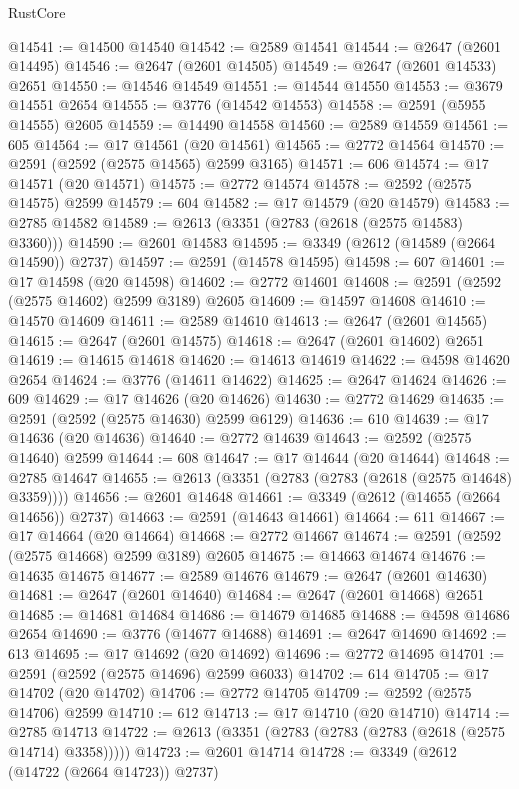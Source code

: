 \begin{lexlean}{RustCore}
\begin{coremodule}
@14541 := @14500 @14540
@14542 := @2589 @14541
@14544 := @2647 (@2601 @14495)
@14546 := @2647 (@2601 @14505)
@14549 := @2647 (@2601 @14533) @2651
@14550 := @14546 @14549
@14551 := @14544 @14550
@14553 := @3679 @14551 @2654
@14555 := @3776 (@14542 @14553)
@14558 := @2591 (@5955 @14555) @2605
@14559 := @14490 @14558
@14560 := @2589 @14559
@14561 := 605
@14564 := @17 @14561 (@20 @14561)
@14565 := @2772 @14564
@14570 := @2591 (@2592 (@2575 @14565) @2599 @3165)
@14571 := 606
@14574 := @17 @14571 (@20 @14571)
@14575 := @2772 @14574
@14578 := @2592 (@2575 @14575) @2599
@14579 := 604
@14582 := @17 @14579 (@20 @14579)
@14583 := @2785 @14582
@14589 := @2613 (@3351 (@2783 (@2618 (@2575 @14583) @3360)))
@14590 := @2601 @14583
@14595 := @3349 (@2612 (@14589 (@2664 @14590)) @2737)
@14597 := @2591 (@14578 @14595)
@14598 := 607
@14601 := @17 @14598 (@20 @14598)
@14602 := @2772 @14601
@14608 := @2591 (@2592 (@2575 @14602) @2599 @3189) @2605
@14609 := @14597 @14608
@14610 := @14570 @14609
@14611 := @2589 @14610
@14613 := @2647 (@2601 @14565)
@14615 := @2647 (@2601 @14575)
@14618 := @2647 (@2601 @14602) @2651
@14619 := @14615 @14618
@14620 := @14613 @14619
@14622 := @4598 @14620 @2654
@14624 := @3776 (@14611 @14622)
@14625 := @2647 @14624
@14626 := 609
@14629 := @17 @14626 (@20 @14626)
@14630 := @2772 @14629
@14635 := @2591 (@2592 (@2575 @14630) @2599 @6129)
@14636 := 610
@14639 := @17 @14636 (@20 @14636)
@14640 := @2772 @14639
@14643 := @2592 (@2575 @14640) @2599
@14644 := 608
@14647 := @17 @14644 (@20 @14644)
@14648 := @2785 @14647
@14655 := @2613 (@3351 (@2783 (@2783 (@2618 (@2575 @14648) @3359))))
@14656 := @2601 @14648
@14661 := @3349 (@2612 (@14655 (@2664 @14656)) @2737)
@14663 := @2591 (@14643 @14661)
@14664 := 611
@14667 := @17 @14664 (@20 @14664)
@14668 := @2772 @14667
@14674 := @2591 (@2592 (@2575 @14668) @2599 @3189) @2605
@14675 := @14663 @14674
@14676 := @14635 @14675
@14677 := @2589 @14676
@14679 := @2647 (@2601 @14630)
@14681 := @2647 (@2601 @14640)
@14684 := @2647 (@2601 @14668) @2651
@14685 := @14681 @14684
@14686 := @14679 @14685
@14688 := @4598 @14686 @2654
@14690 := @3776 (@14677 @14688)
@14691 := @2647 @14690
@14692 := 613
@14695 := @17 @14692 (@20 @14692)
@14696 := @2772 @14695
@14701 := @2591 (@2592 (@2575 @14696) @2599 @6033)
@14702 := 614
@14705 := @17 @14702 (@20 @14702)
@14706 := @2772 @14705
@14709 := @2592 (@2575 @14706) @2599
@14710 := 612
@14713 := @17 @14710 (@20 @14710)
@14714 := @2785 @14713
@14722 := @2613 (@3351 (@2783 (@2783 (@2783 (@2618 (@2575 @14714) @3358)))))
@14723 := @2601 @14714
@14728 := @3349 (@2612 (@14722 (@2664 @14723)) @2737)

\end{coremodule}
\end{lexlean}
